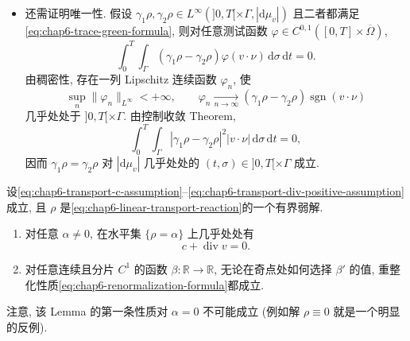 \begin{sloppypar}
\begin{Proof}
\begin{itemize}
 \item 还需证明唯一性. 假设 $\gamma_1\rho,\gamma_2\rho\in L^\infty(]0,T[\times\Gamma,|\mathrm d\mu_v|)$ 且二者都满足\eqref{eq:chap6-trace-green-formula}, 则对任意测试函数 $\varphi\in C^{0,1}([0,T]\times\overline\Omega)$,
 \[
  \int_0^T\int_\Gamma(\gamma_1\rho-\gamma_2\rho)
  \varphi(v\cdot\nu)\,\mathrm d\sigma\,\mathrm dt=0.
 \]
 由稠密性, 存在一列 Lipschitz 连续函数 $\varphi_n$, 使
 \[
  \sup_n\|\varphi_n\|_{L^\infty}<+\infty,
  \qquad
  \varphi_n\xrightarrow[n\to\infty]{}
  (\gamma_1\rho-\gamma_2\rho)\operatorname{sgn}(v\cdot\nu)
 \]
 几乎处处于 $]0,T[\times\Gamma$. 由控制收敛 Theorem,
 \[
  \int_0^T\int_\Gamma|\gamma_1\rho-\gamma_2\rho|^2
  |v\cdot\nu|\,\mathrm d\sigma\,\mathrm dt=0,
 \]
 因而 $\gamma_1\rho=\gamma_2\rho$ 对 $|\mathrm d\mu_v|$ 几乎处处的 $(t,\sigma)\in]0,T[\times\Gamma$ 成立.
\end{itemize}
\end{Proof}
\begin{Corollary}
\label{cor:chap6-piecewise-renormalization}
设\eqref{eq:chap6-transport-c-assumption}--\eqref{eq:chap6-transport-div-positive-assumption}成立, 且 $\rho$ 是\eqref{eq:chap6-linear-transport-reaction}的一个有界弱解.
\begin{enumerate}
 \item 对任意 $\alpha\neq0$, 在水平集 $\{\rho=\alpha\}$ 上几乎处处有
 \[
  c+\operatorname{div}v=0.
 \]
 \item 对任意连续且分片 $C^1$ 的函数 $\beta:\mathbb R\to\mathbb R$, 无论在奇点处如何选择 $\beta'$ 的值, 重整化性质\eqref{eq:chap6-renormalization-formula}都成立.
\end{enumerate}
\end{Corollary}

\begin{Proof}
注意, 该 Lemma 的第一条性质对 $\alpha=0$ 不可能成立 (例如解 $\rho\equiv0$ 就是一个明显的反例).


\end{Proof}
\end{sloppypar}
